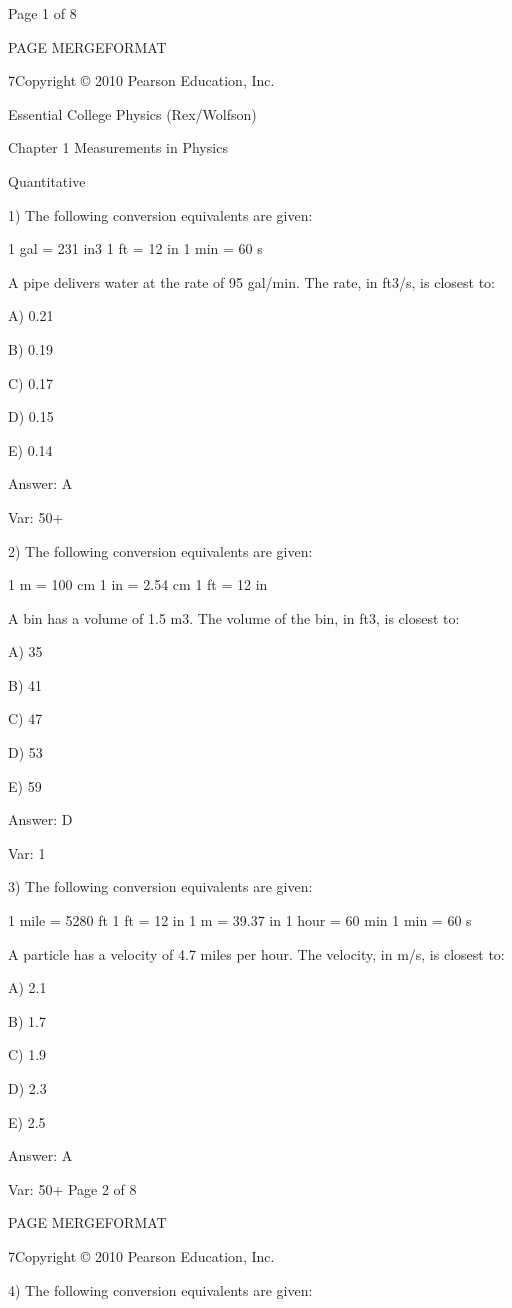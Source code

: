 Page 1 of 8

PAGE \* MERGEFORMAT

7Copyright © 2010 Pearson Education, Inc.

Essential College Physics (Rex/Wolfson)

Chapter 1 Measurements in Physics

Quantitative

1) The following conversion equivalents are given:

1 gal = 231 in3 1 ft = 12 in 1 min = 60 s

A pipe delivers water at the rate of 95 gal/min. The rate, in ft3/s, is closest to:

A) 0.21

B) 0.19

C) 0.17

D) 0.15

E) 0.14

Answer: A

Var: 50+

2) The following conversion equivalents are given:

1 m = 100 cm 1 in = 2.54 cm 1 ft = 12 in

A bin has a volume of 1.5 m3. The volume of the bin, in ft3, is closest to:

A) 35

B) 41

C) 47

D) 53

E) 59

Answer: D

Var: 1

3) The following conversion equivalents are given:

1 mile = 5280 ft 1 ft = 12 in 1 m = 39.37 in 1 hour = 60 min 1 min = 60 s

A particle has a velocity of 4.7 miles per hour. The velocity, in m/s, is closest to:

A) 2.1

B) 1.7

C) 1.9

D) 2.3

E) 2.5

Answer: A

Var: 50+
Page 2 of 8

PAGE \* MERGEFORMAT

7Copyright © 2010 Pearson Education, Inc.

4) The following conversion equivalents are given:

